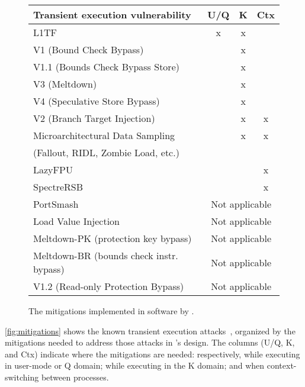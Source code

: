 \begin{figure}
\centering
\small
\begin{tabular}{lccc}
{\bf Transient execution vulnerability} & {\bf U/Q} & {\bf K} & {\bf Ctx} \\

\midrule
L1TF & x & x & \\

\midrule
V1 (Bound Check Bypass) & & x & \\
V1.1 (Bounds Check Bypass Store) & & x &\\
V3 (Meltdown) && x &\\
V4 (Speculative Store Bypass) &	 & x &  \\

\midrule
V2 (Branch Target Injection) & & x & x \\
Microarchitectural Data Sampling && x & x\\
\qquad (Fallout, RIDL, Zombie Load, etc.) \\

\midrule

LazyFPU &&& x \\
SpectreRSB &&& x\\

\midrule
PortSmash & \multicolumn{3}{c}{Not applicable} \\
Load Value Injection & \multicolumn{3}{c}{Not applicable} \\
Meltdown-PK (protection key bypass) & \multicolumn{3}{c}{Not applicable} \\
Meltdown-BR (bounds check instr. bypass) & \multicolumn{3}{c}{Not applicable} \\
V1.2 (Read-only Protection Bypass) & \multicolumn{3}{c}{Not applicable} \\

\end{tabular}
\caption{The mitigations implemented in software by \sys{}.}
\label{fig:mitigations}
\end{figure}

\autoref{fig:mitigations} shows the known transient execution
attacks~\cite{hill:survey,sok:transient}, organized by the mitigations
needed to address those attacks in \sys's design.  The columns (U/Q, K,
and Ctx) indicate where the mitigations are needed: respectively, while
executing in user-mode or Q domain; while executing in the K domain;
and when context-switching between processes.


